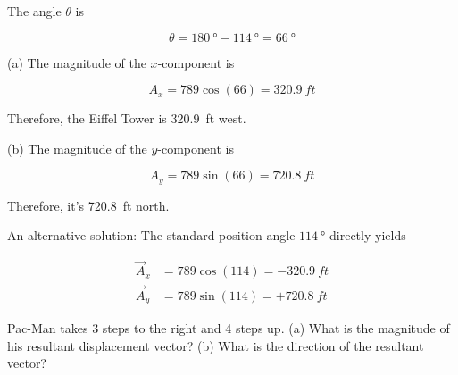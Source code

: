 \documentclass[main.tex]{subfiles}
\begin{document}
\Solution

\begin{figure}[h!]
    \centering
{}
\end{figure}

The angle $\theta$ is

\begin{equation*}
    \theta = \SI{180}{\degree} - \SI{114}{\degree} = \SI{66}{\degree}
\end{equation*}

(a) The magnitude of the $x$-component is 

\begin{equation*}
    A_x = 789 \cos{(66)} = \SI{320.9}{ft}
\end{equation*}

Therefore, the Eiffel Tower is \SI{320.9}{ft} west.

(b) The magnitude of the $y$-component is

\begin{equation*}
    A_y = 789 \sin{(66)} = \SI{720.8}{ft}
\end{equation*}

Therefore, it's \SI{720.8}{ft} north.

An alternative solution: The standard position angle $\SI{114}{\degree}$ directly yields 

\begin{align*}
    \vec{A}_x &= 789 \cos{(114)} = -\SI{320.9}{ft}\\[1ex]
    \vec{A}_y &= 789 \sin{(114)} = +\SI{720.8}{ft}
\end{align*}

\begin{example}
    Pac-Man takes 3 steps to the right and 4 steps up. (a) What is the magnitude of his resultant displacement vector? (b) What is the direction of the resultant vector?
\end{example}
\end{document}
